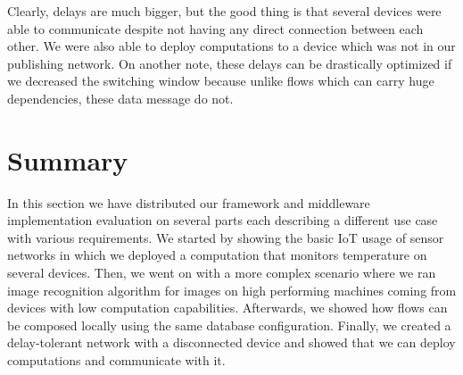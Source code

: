 \noindent Clearly, delays are much bigger, but the good thing is that several devices were able to communicate despite not having any direct connection between each other. We were also able to deploy computations to a device which was not in our publishing network. On another note, these delays can be drastically optimized if we decreased the switching window because unlike flows which can carry huge dependencies, these data message do not.

\section{Summary}

In this section we have distributed our framework and middleware implementation evaluation on several parts each describing a different use case with various requirements. We started by showing the basic IoT usage of sensor networks in which we deployed a computation that monitors temperature on several devices.  Then, we went on with a more complex scenario where we ran image recognition algorithm for images on high performing machines coming from devices with low computation capabilities. Afterwards, we showed how flows can be composed locally using the same database configuration. Finally, we created a delay-tolerant network with a disconnected device and showed that we can deploy computations and communicate with it.

